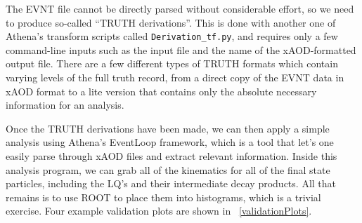         The EVNT file cannot be directly parsed without considerable effort, so we need to produce so-called ``TRUTH derivations''. This is done with another one of Athena's transform scripts called \texttt{Derivation_tf.py}, and requires only a few command-line inputs such as the input file and the name of the xAOD-formatted output file. There are a few different types of TRUTH formats which contain varying levels of the full truth record, from a direct copy of the EVNT data in xAOD format to a lite version that contains only the absolute necessary information for an analysis.

        Once the TRUTH derivations have been made, we can then apply a simple analysis using Athena's EventLoop framework, which is a tool that let's one easily parse through xAOD files and extract relevant information. Inside this analysis program, we can grab all of the kinematics for all of the final state particles, including the LQ's and their intermediate decay products. All that remains is to use ROOT to place them into histograms, which is a trivial exercise. Four example validation plots are shown in ~\ref{validationPlots}.
        
